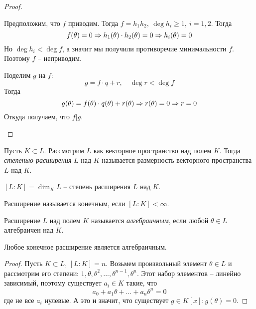 \begin{proof}
	\begin{MyList}
		\item Предположим, что $f$ приводим. Тогда $f = h_1 h_2, \ \deg h_i \geqslant 1, \ i = 1, 2$. Тогда
		\[f(\theta) = 0 \Rightarrow h_1 (\theta) \cdot h_2 (\theta) = 0 \Rightarrow h_i(\theta) = 0\]
		Но $\deg h_i < \deg f$, а значит мы получили противоречие минимальности $f$. Поэтому $f$ -- неприводим.

		\item Поделим $g$ на $f$:
		\[g = f \cdot q + r, \quad \deg r < \deg f\]
		Тогда
		\[g(\theta) = f(\theta) \cdot q(\theta) + r(\theta) \Rightarrow r(\theta) = 0 \Rightarrow r = 0\]
		Откуда получаем, что $f | g$.
	\end{MyList}
\end{proof}

\begin{Def}
	Пусть $K \subset L$. Рассмотрим $L$ как векторное пространство над полем $K$.
	Тогда \textit{степенью расширения} $L$ над $K$ называется размерность векторного пространства $L$ над $K$.   
\end{Def}

\begin{notation}
	$[L : K] = \dim_K L$ -- степень расширения $L$ над $K$. 
\end{notation}

\begin{Rem}
	Расширение называется конечным, если $[L : K] < \infty$. 
\end{Rem}

\begin{Def}
	Расширение $L$ над полем $K$ называется \textit{алгебраичным}, если любой $\theta \in L$ алгебраичен над $K$.
\end{Def}

\begin{Thm}
	Любое конечное расширение является алгебраичным.
\end{Thm}

\begin{proof}
	Пусть $K \subset L$, $[L : K] = n$. Возьмем произвольный элемент $\theta \in L$ и рассмотрим его степени: $1, \theta, \theta^2, ..., \theta^{n - 1}, \theta^n$. 
	Этот набор элементов -- линейно зависимый, поэтому существует $a_i \in K$ такие, что 
	\[a_0 + a_1 \theta + ... + a_n \theta^n = 0\]
	где не все $a_i$ нулевые. А это и значит, что существует $g \in K[x] : g(\theta) = 0$.  
\end{proof}

